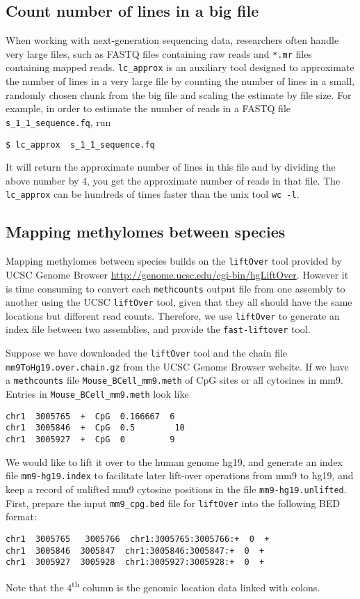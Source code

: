 \documentclass[10pt]{article}
\newcommand{\prog}[1]{\texttt{#1}}
\newcommand{\fn}[1]{\texttt{#1}}
\begin{document}
{{\subsection{Count number of lines in a big file}
\label{sec:count-number-lines}

When working with next-generation sequencing data, researchers often
handle very large files, such as FASTQ files containing raw reads
and \fn{*.mr} files containing mapped reads. \prog{lc\_approx} is
an auxiliary tool designed to approximate the number of lines in a
very large file by counting the number of lines in a small, randomly
chosen chunk from the big file and scaling the estimate by file size.
For example, in order to estimate the number of reads in a FASTQ file
\fn{s\_1\_1\_sequence.fq}, run
\begin{verbatim}
$ lc_approx  s_1_1_sequence.fq
\end{verbatim}
It will return the approximate number of lines in this file and by
dividing the above number by 4, you get the approximate number of
reads in that file. The \prog{lc\_approx} can be hundreds of times
faster than the unix tool \prog{wc -l}.


\subsection{Mapping methylomes between species}
\label{sec:mapp-methyl-betw}
Mapping methylomes between species builds on the \prog{liftOver} tool
provided by UCSC Genome Browser
\url{http://genome.ucsc.edu/cgi-bin/hgLiftOver}. However it is time
consuming to convert each \prog{methcounts} output file from one
assembly to another using the UCSC \prog{liftOver} tool, given that
they all should have the same locations but different read counts. 
Therefore, we use \prog{liftOver} to generate an index file between 
two assemblies, and provide the \prog{fast-liftover} tool.

Suppose we have downloaded the \prog{liftOver} tool and the chain file
\fn{mm9ToHg19.over.chain.gz} from the UCSC Genome Browser website.  If
we have a \prog{methcounts} file \fn{Mouse\_BCell\_mm9.meth}
of CpG sites or all cytosines in mm9. Entries in
\fn{Mouse\_BCell\_mm9.meth} look like
\begin{verbatim}
chr1  3005765  +  CpG  0.166667  6
chr1  3005846  +  CpG  0.5        10
chr1  3005927  +  CpG  0         9
\end{verbatim}

We would like to lift it over to the human genome hg19, and generate
an index file \fn{mm9-hg19.index} to facilitate later lift-over
operations from mm9 to hg19, and keep a record of unlifted mm9
cytosine positions in the file \fn{mm9-hg19.unlifted}. 
First, prepare the input \fn{mm9\_cpg.bed} file for \prog{liftOver} into 
the following BED format: 
\begin{verbatim}
chr1  3005765 	3005766  chr1:3005765:3005766:+  0  +
chr1  3005846  3005847  chr1:3005846:3005847:+  0  +
chr1  3005927  3005928  chr1:3005927:3005928:+  0  +
\end{verbatim}
Note that the 4\textsuperscript{th} column is the genomic location data linked
with colons. 

}}
\end{document}
